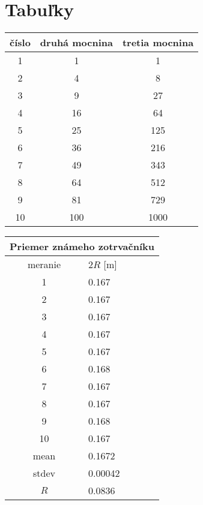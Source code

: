 \section{Tabuľky}


\begin{minipage}[c]{0.5\textwidth}
	\centering
	\begin{tabular}{| c | c | c |}
		\hline
		číslo & druhá mocnina & tretia mocnina\\
		\hline
		1 & 1 & 1\\
		2 & 4 & 8\\
		3 & 9 & 27\\
		4 & 16 & 64\\
		5 & 25 & 125\\
		6 & 36 & 216\\
		7 & 49 & 343\\
		8 & 64 & 512\\
		9 & 81 & 729\\
		10 & 100 & 1000\\
		\hline
	\end{tabular}
	\label{table:druhe-a-tretie-mocniny}
\end{minipage}
\begin{minipage}[c]{0.5\textwidth}
	\centering
	\begin{tabular}{|ll|}
		\hline
		\multicolumn{2}{|c|}{Priemer známeho zotrvačníku}    \\ \hline
		\multicolumn{1}{|c|}{meranie} & $2R$ {[}\si{\metre}{]}   \\ \hline
		\multicolumn{1}{|c|}{1}       & 0.167                \\ 
		\multicolumn{1}{|c|}{2}       & 0.167                \\ 
		\multicolumn{1}{|c|}{3}       & 0.167                \\ 
		\multicolumn{1}{|c|}{4}       & 0.167                \\ 
		\multicolumn{1}{|c|}{5}       & 0.167                \\ 
		\multicolumn{1}{|c|}{6}       & 0.168                \\ 
		\multicolumn{1}{|c|}{7}       & 0.167                \\ 
		\multicolumn{1}{|c|}{8}       & 0.167                \\ 
		\multicolumn{1}{|c|}{9}       & 0.168                \\ 
		\multicolumn{1}{|c|}{10}      & 0.167                \\ \hline
		\multicolumn{1}{|c|}{mean}    & 0.1672               \\ 
		\multicolumn{1}{|c|}{stdev}     & 0.00042 \\ \hline
		\multicolumn{1}{|c|}{$R$}       & 0.0836               \\ \hline
	\end{tabular}
	\label{tab:R}
\end{minipage}

\vspace{20pt}